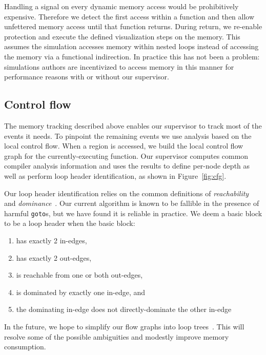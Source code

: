 Handling a signal on every dynamic memory access would be prohibitively
expensive.  Therefore we detect the first access within a function
and then allow unfettered memory access until that function returns.
During return, we re-enable protection and execute the defined
visualization steps on the memory.  This assumes the simulation
accesses memory within nested loops instead of accessing the memory via
a functional indirection.  In practice this has not been a problem:
simulations authors are incentivized to access memory in this manner
for performance reasons with or without our supervisor.


\subsection{Control flow}

The memory tracking described above enables our supervisor to track
most of the events it needs.  To pinpoint the remaining events we use
analysis based on the local control flow.  When a region is accessed,
we build the local control flow graph for the currently-executing
function.  Our supervisor computes common compiler analysis information
and uses the results to define per-node depth as well as perform loop
header identification,
as shown in Figure~\ref{fig:cfg}.

Our loop header identification relies on the common definitions of
\textit{reachability} and
\textit{dominance}~\cite{Torczon:2007:Compiler}.  Our current algorithm
is
known to be fallible in the presence of harmful \texttt{goto}s, but we
have found it is reliable in practice.  We deem a basic block to be a
loop header when the basic block:
\begin{enumerate}
	\itemsep0em

  \item has exactly 2 in-edges,

	\item has exactly 2 out-edges,

	\item is reachable from one or both out-edges,

	\item is dominated by exactly one in-edge, and

	\item the dominating in-edge does not directly-dominate the other in-edge

\end{enumerate}
In the future, we hope to simplify our flow graphs into loop
trees~\cite{Torczon:2007:Compiler}.  This will resolve some of the
possible ambiguities and modestly improve memory consumption.

